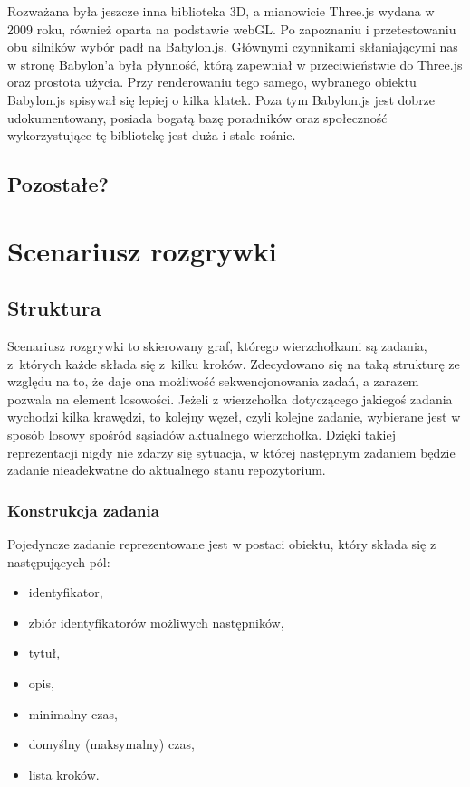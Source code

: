 \documentclass[11pt,a4paper,polish,thesis]{dcsbook}
\begin{document}
	Rozważana była jeszcze inna biblioteka 3D, a mianowicie Three.js wydana w 2009 roku, również oparta na podstawie webGL. Po zapoznaniu i przetestowaniu obu silników wybór padł na Babylon.js. Głównymi czynnikami skłaniającymi nas w stronę Babylon'a była płynność, którą zapewniał w przeciwieństwie do Three.js oraz prostota użycia. Przy renderowaniu tego samego, wybranego obiektu Babylon.js spisywał się lepiej o kilka klatek. Poza tym Babylon.js jest dobrze udokumentowany, posiada bogatą bazę poradników oraz społeczność wykorzystujące tę bibliotekę jest duża i stale rośnie.
	
	\subsection{Pozostałe?}
	
	\section{Scenariusz rozgrywki}
	
	\subsection{Struktura} \label{Struktura}
	
	Scenariusz rozgrywki to skierowany graf, którego wierzchołkami są zadania, z~których każde składa się z~kilku kroków. Zdecydowano się na taką strukturę ze względu na to, że daje ona możliwość sekwencjonowania zadań, a zarazem pozwala na element losowości. Jeżeli z wierzchołka dotyczącego jakiegoś zadania wychodzi kilka krawędzi, to kolejny węzeł, czyli kolejne zadanie, wybierane jest w sposób losowy spośród sąsiadów aktualnego wierzchołka. Dzięki takiej reprezentacji nigdy nie zdarzy się sytuacja, w której następnym zadaniem będzie zadanie nieadekwatne do aktualnego stanu repozytorium.

	\subsubsection{Konstrukcja zadania}
	Pojedyncze zadanie reprezentowane jest w postaci obiektu, który składa się z następujących pól:
	\begin{itemize}
	\item identyfikator,
	\item zbiór identyfikatorów możliwych następników,
	\item tytuł,
	\item opis,
	\item minimalny czas,
	\item domyślny (maksymalny) czas,
	\item lista kroków.	
	\end{itemize}
	
\end{document}
